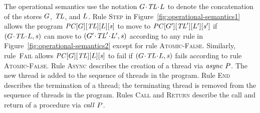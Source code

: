 The operational semantics use the notation ${G}\!\cdot\!{\mathit{TL}}\!\cdot\!{L}$ to denote the concatenation of the 
stores $G$, $\mathit{TL}$, and $L$.
Rule \textsc{Step} in Figure~\ref{fig:operational-semantics1} allows the program $\mathit{PC}[G][\mathit{TL}][L][\mathit{s}]$ to move 
to $\mathit{PC}[G'][\mathit{TL}'][L'][\mathit{s}']$
if $({G}\!\cdot\!{\mathit{TL}}\!\cdot\!{L}, \mathit{s})$ can move to $({G'}\!\cdot\!{\mathit{TL}'}\!\cdot\!{L'}, \mathit{s})$ 
according to any rule in Figure~\ref{fig:operational-semantics2} except for rule \textsc{Atomic-False}.
Similarly, rule~\textsc{Fail} allows $\mathit{PC}[G][\mathit{TL}][L][\mathit{s}]$ to fail if $({G}\!\cdot\!{\mathit{TL}}\!\cdot\!{L}, \mathit{s})$
fails according to rule \textsc{Atomic-False}. 
Rule \textsc{Async} describes the creation of a thread via $\mathit{async}\ P$.  
The new thread is added to the sequence of threads in the program.
Rule \textsc{End} describes the termination of a thread; the terminating thread is removed
from the sequence of threads in the program.
Rules \textsc{Call} and \textsc{Return} describe the call and return of a procedure via $\mathit{call}\ P$.

